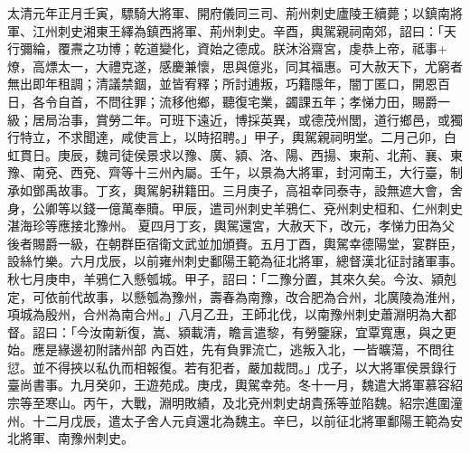 \begin{pinyinscope}
 太清元年正月壬寅，驃騎大將軍、開府儀同三司、荊州刺史廬陵王續薨；以鎮南將軍、江州刺史湘東王繹為鎮西將軍、荊州刺史。辛酉，輿駕親祠南郊，詔曰：「天行彌綸，覆燾之功博；乾道變化，資始之德成。朕沐浴齋宮，虔恭上帝，祗事+燎，高熛太一，大禮克遂，感慶兼懷，思與億兆，同其福惠。可大赦天下，尤窮者無出即年租調；清議禁錮，並皆宥釋；所討逋叛，巧籍隱年，闇丁匿口，開恩百
 日，各令自首，不問往罪；流移他鄉，聽復宅業，蠲課五年；孝悌力田，賜爵一級；居局治事，賞勞二年。可班下遠近，博採英異，或德茂州閭，道行鄉邑，或獨行特立，不求聞達，咸使言上，以時招聘。」甲子，輿駕親祠明堂。二月己卯，白虹貫日。庚辰，魏司徒侯景求以豫、廣、潁、洛、陽、西揚、東荊、北荊、襄、東豫、南兗、西兗、齊等十三州內屬。壬午，以景為大將軍，封河南王，大行臺，制承如鄧禹故事。丁亥，輿駕躬耕籍田。三月庚子，高祖幸同泰寺，設無遮大會，舍身，公卿等以錢一億萬奉贖。甲辰，遣司州刺史羊鴉仁、兗州刺史桓和、仁州刺史湛海珍等應接北豫州。
 夏四月丁亥，輿駕還宮，大赦天下，改元，孝悌力田為父後者賜爵一級，在朝群臣宿衛文武並加頒賚。五月丁酉，輿駕幸德陽堂，宴群臣，設絲竹樂。六月戊辰，以前雍州刺史鄱陽王範為征北將軍，總督漢北征討諸軍事。秋七月庚申，羊鴉仁入懸瓠城。甲子，詔曰：「二豫分置，其來久矣。今汝、潁剋定，可依前代故事，以懸瓠為豫州，壽春為南豫，改合肥為合州，北廣陵為淮州，項城為殷州，合州為南合州。」八月乙丑，王師北伐，以南豫州刺史蕭淵明為大都督。詔曰：「今汝南新復，嵩、潁載清，瞻言遣黎，有勞鑒寐，宜覃寬惠，與之更始。應是緣邊初附諸州部
 內百姓，先有負罪流亡，逃叛入北，一皆曠蕩，不問往愆。並不得挾以私仇而相報復。若有犯者，嚴加裁問。」戊子，以大將軍侯景錄行臺尚書事。九月癸卯，王遊苑成。庚戌，輿駕幸苑。冬十一月，魏遣大將軍慕容紹宗等至寒山。丙午，大戰，淵明敗績，及北兗州刺史胡貴孫等並陷魏。紹宗進圍潼州。十二月戊辰，遣太子舍人元貞還北為魏主。辛巳，以前征北將軍鄱陽王範為安北將軍、南豫州刺史。




\end{pinyinscope}
